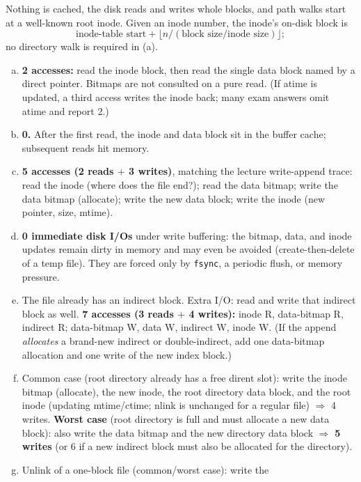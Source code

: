 \documentclass[11pt,a4paper]{article}
\newenvironment{Sol}{%
  \begin{tcolorbox}[sboxstyle, title={Solution}]%
}{%
  \end{tcolorbox}\vspace{0.35em}%
}
\begin{document}
\begin{Sol}
Nothing is cached, the disk reads and writes whole blocks, and path
walks start at a well-known root inode. Given an inode number, the inode's
on-disk block is
\[
\text{inode-table start} + \bigl\lfloor n / (\text{block size}/\text{inode size})\bigr\rfloor;
\]
no directory walk is required in (a).
\begin{enumerate}[(a)]
\item \textbf{2 accesses:} read the inode block, then read the single
      data block named by a direct pointer. Bitmaps are not consulted on
      a pure read. (If atime is updated, a third access writes the inode
      back; many exam answers omit atime and report 2.)
\item \textbf{0.} After the first read, the inode and data block sit in
      the buffer cache; subsequent reads hit memory.
\item \textbf{5 accesses (2 reads $+$ 3 writes)}, matching the lecture
      write-append trace: read the inode (where does the file end?);
      read the data bitmap; write the data bitmap (allocate); write the
      new data block; write the inode (new pointer, size, mtime).
\item \textbf{0 immediate disk I/Os} under write buffering: the bitmap,
      data, and inode updates remain dirty in memory and may even be
      avoided (create-then-delete of a temp file). They are forced only
      by \texttt{fsync}, a periodic flush, or memory pressure.
\item The file already has an indirect block. Extra I/O: read and write
      that indirect block as well.
      \textbf{7 accesses (3 reads $+$ 4 writes):}
      inode R, data-bitmap R, indirect R;
      data-bitmap W, data W, indirect W, inode W.
      (If the append \emph{allocates} a brand-new indirect or
      double-indirect, add one data-bitmap allocation and one write of
      the new index block.)
\item Common case (root directory already has a free dirent slot):
      write the inode bitmap (allocate), the new inode, the root
      directory data block, and the root inode (updating mtime/ctime;
      nlink is unchanged for a regular file) $\Rightarrow$ 4 writes.
      \textbf{Worst case} (root directory is full and must allocate a
      new data block): also write the data bitmap and the new directory
      data block $\Rightarrow$ \textbf{5 writes} (or 6 if a new indirect
      block must also be allocated for the directory).
\item Unlink of a one-block file (common/worst case): write the

\end{enumerate}
\end{Sol}
\end{document}
